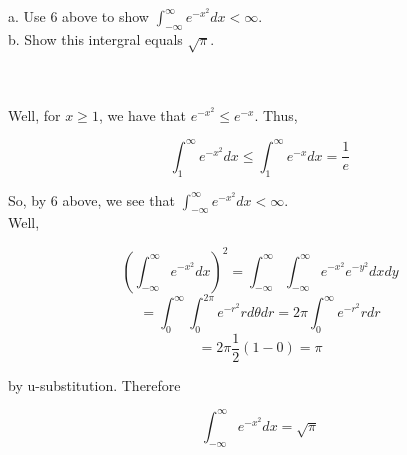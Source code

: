 a. Use 6 above to show $\int_{-\infty}^{\infty}e^{-x^2}dx<\infty$.\\

b. Show this intergral equals $\sqrt{\pi}$.\\\\

\begin{solution}\renewcommand{\qedsymbol}{}\ \\
    Well, for $x\geq1$, we have that $e^{-x^2}\leq e^{-x}$. Thus,
    
    $$\int_{1}^{\infty}e^{-x^2}dx\leq\int_{1}^{\infty}e^{-x}dx=\frac1e$$
    
    So, by 6 above, we see that $\int_{-\infty}^{\infty}e^{-x^2}dx<\infty$.\\

    Well,
    
    $$(\int_{-\infty}^{\infty}e^{-x^2}dx)^2=\int_{-\infty}^{\infty}\int_{-\infty}^{\infty}
    e^{-x^2}e^{-y^2}dxdy$$
    $$=\int_{0}^{\infty}\int_{0}^{2\pi}e^{-r^2}rd\theta dr=2\pi\int_{0}^{\infty}e^{-r^2}rdr$$
    $$=2\pi\frac12(1-0)=\pi$$
    
    by u-substitution. Therefore
    
    $$\int_{-\infty}^{\infty}e^{-x^2}dx=\sqrt{\pi}$$

\end{solution}